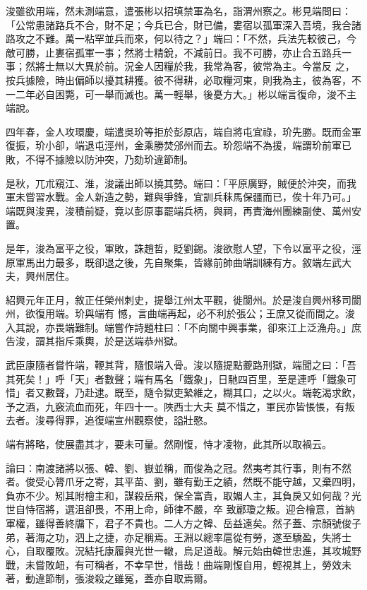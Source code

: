 \begin{pinyinscope}
 浚雖欲用端，然未測端意，遣張彬以招填禁軍為名，詣渭州察之。彬見端問曰：「公常患諸路兵不合，財不足；今兵已合，財已備，婁宿以孤軍深入吾境，我合諸路攻之不難。萬一粘罕並兵而來，何以待之？」端曰：「不然，兵法先較彼己，今敵可勝，止婁宿孤軍一事；然將士精銳，不減前日。我不可勝，亦止合五路兵一事；然將士無以大異於前。況金人因糧於我，我常為客，彼常為主。今當反
 之，按兵據險，時出偏師以擾其耕獲。彼不得耕，必取糧河東，則我為主，彼為客，不一二年必自困斃，可一舉而滅也。萬一輕舉，後憂方大。」彬以端言復命，浚不主端說。



 四年春，金人攻環慶，端遣吳玠等拒於彭原店，端自將屯宜祿，玠先勝。既而金軍復振，玠小卻，端退屯涇州，金乘勝焚邠州而去。玠怨端不為援，端謂玠前軍已敗，不得不據險以防沖突，乃劾玠違節制。



 是秋，兀朮窺江、淮，浚議出師以撓其勢。端曰：「平原廣野，賊便於沖突，而我
 軍未嘗習水戰。金人新造之勢，難與爭鋒，宜訓兵秣馬保疆而已，俟十年乃可。」端既與浚異，浚積前疑，竟以彭原事罷端兵柄，與祠，再責海州團練副使、萬州安置。



 是年，浚為富平之役，軍敗，誅趙哲，貶劉錫。浚欲慰人望，下令以富平之役，涇原軍馬出力最多，既卻退之後，先自聚集，皆緣前帥曲端訓練有方。敘端左武大夫，興州居住。



 紹興元年正月，敘正任榮州刺史，提舉江州太平觀，徙閬州。於是浚自興州移司閬州，欲復用端。玠與端有
 憾，言曲端再起，必不利於張公；王庶又從而間之。浚入其說，亦畏端難制。端嘗作詩題柱曰：「不向關中興事業，卻來江上泛漁舟。」庶告浚，謂其指斥乘輿，於是送端恭州獄。



 武臣康隨者嘗忤端，鞭其背，隨恨端入骨。浚以隨提點夔路刑獄，端聞之曰：「吾其死矣！」呼「天」者數聲；端有馬名「鐵象」，日馳四百里，至是連呼「鐵象可惜」者又數聲，乃赴逮。既至，隨令獄吏縶維之，糊其口，之以火。端乾渴求飲，予之酒，九竅流血而死，年四十一。陜西士大夫
 莫不惜之，軍民亦皆悵悵，有叛去者。浚尋得罪，追復端宣州觀察使，謚壯愍。



 端有將略，使展盡其才，要未可量。然剛愎，恃才凌物，此其所以取禍云。



 論曰：南渡諸將以張、韓、劉、嶽並稱，而俊為之冠。然夷考其行事，則有不然者。俊受心膂爪牙之寄，其平苗、劉，雖有勤王之績，然既不能守越，又棄四明，負亦不少。矧其附檜主和，謀殺岳飛，保全富貴，取媚人主，其負戾又如何哉？光世自恃宿將，選沮卻畏，不用上命，師律不嚴，卒
 致酈瓊之叛。迎合檜意，首納軍權，雖得善終牖下，君子不貴也。二人方之韓、岳益遠矣。然子蓋、宗顏號俊子弟，著海之功，泗上之捷，亦足稱焉。王淵以總率扈從有勞，遂至驕盈，失將士心，自取覆敗。況結托康履與光世一轍，烏足道哉。解元始由韓世忠進，其攻城野戰，未嘗敗衄，有可稱者，不幸早世，惜哉！曲端剛愎自用，輕視其上，勞效未著，動違節制，張浚殺之雖冤，蓋亦自取焉爾。



\end{pinyinscope}